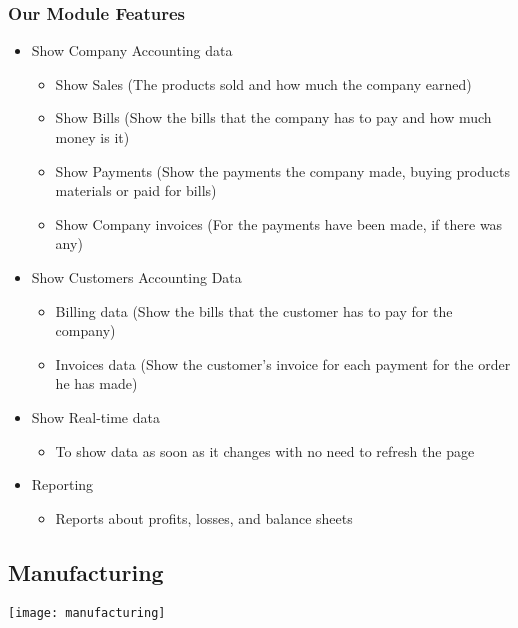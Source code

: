 \subsubsection{Our Module Features}
\begin{itemize}
    \item Show Company Accounting data
    \begin{itemize}
        \item Show Sales (The products sold and how much the company earned)
        \item Show Bills (Show the bills that the company has to pay and how much money is it)
        \item Show Payments (Show the payments the company made, buying products materials
        or paid for bills)
        \item Show Company invoices (For the payments have been made, if there was any)
    \end{itemize}
    \item Show Customers Accounting Data
    \begin{itemize}
        \item Billing data (Show the bills that the customer has to pay for the company)
        \item Invoices data (Show the customer’s invoice for each payment for the order he has
        made)
    \end{itemize}
    \item Show Real-time data
    \begin{itemize}
        \item To show data as soon as it changes with no need to refresh the page
    \end{itemize}
    \item Reporting
    \begin{itemize}
        \item Reports about profits, losses, and balance sheets
    \end{itemize}
    
\end{itemize}


\break

\subsection{Manufacturing}
\begin{center}
    \texttt{[image: manufacturing]}
\end{center}

